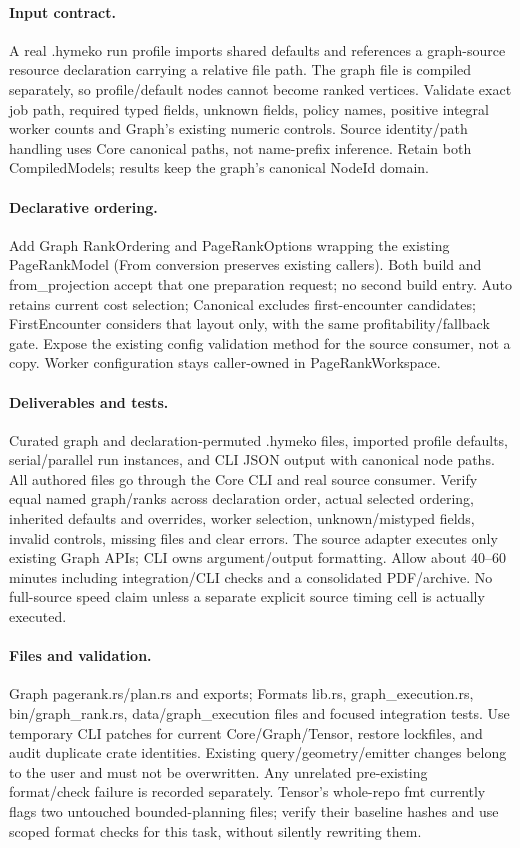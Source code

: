 \documentclass[11pt,a4paper]{article}
\begin{document}
\paragraph{Input contract.} A real .hymeko run profile imports shared defaults and
references a graph-source resource declaration carrying a relative file path. The
graph file is compiled separately, so profile/default nodes cannot become ranked
vertices. Validate exact job path, required typed fields, unknown fields, policy
names, positive integral worker counts and Graph's existing numeric controls. Source
identity/path handling uses Core canonical paths, not name-prefix inference.
Retain both CompiledModels; results keep the graph's canonical NodeId domain.
\paragraph{Declarative ordering.} Add Graph RankOrdering and PageRankOptions wrapping
the existing PageRankModel (From conversion preserves existing callers). Both build
and from\_projection accept that one preparation request; no second build entry.
Auto retains current cost selection; Canonical excludes first-encounter candidates;
FirstEncounter considers that layout only, with the same profitability/fallback gate.
Expose the existing config validation method for the source consumer, not a copy.
Worker configuration stays caller-owned in PageRankWorkspace.
\paragraph{Deliverables and tests.} Curated graph and declaration-permuted .hymeko
files, imported profile defaults, serial/parallel run instances, and CLI JSON output
with canonical node paths. All authored files go through the Core CLI and real source
consumer. Verify equal named graph/ranks across declaration order, actual selected
ordering, inherited defaults and overrides, worker selection, unknown/mistyped fields,
invalid controls, missing files and clear errors. The source adapter executes only
existing Graph APIs; CLI owns argument/output formatting. Allow about 40--60 minutes
including integration/CLI checks and a consolidated PDF/archive. No full-source speed
claim unless a separate explicit source timing cell is actually executed.
\paragraph{Files and validation.} Graph pagerank.rs/plan.rs and exports; Formats
lib.rs, graph\_execution.rs, bin/graph\_rank.rs, data/graph\_execution files and focused
integration tests. Use temporary CLI patches for current Core/Graph/Tensor, restore
lockfiles, and audit duplicate crate identities. Existing query/geometry/emitter
changes belong to the user and must not be overwritten. Any unrelated pre-existing
format/check failure is recorded separately. Tensor's whole-repo fmt currently flags
two untouched bounded-planning files; verify their baseline hashes and use scoped
format checks for this task, without silently rewriting them.
\end{document}
